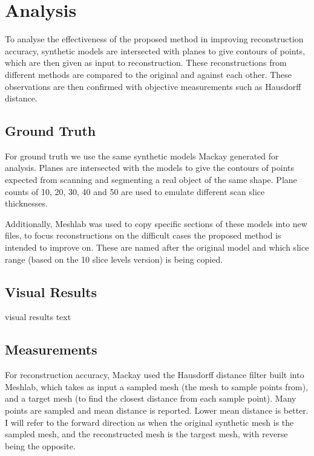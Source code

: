 \documentclass[11p, titlepage]{article}
\begin{document}
\section{Analysis}

To analyse the effectiveness of the proposed method in improving reconstruction accuracy, synthetic models are intersected with planes to give contours of points, which are then given as input to reconstruction. These reconstructions from different methods are compared to the original and against each other. These observations are then confirmed with objective measurements such as Hausdorff distance.

\subsection{Ground Truth}

For ground truth we use the same synthetic models Mackay generated for analysis. Planes are intersected with the models to give the contours of points expected from scanning and segmenting a real object of the same shape. Plane counts of 10, 20, 30, 40 and 50 are used to emulate different scan slice thicknesses.

Additionally, Meshlab was used to copy specific sections of these models into new files, to focus reconstructions on the difficult cases the proposed method is intended to improve on. These are named after the original model and which slice range (based on the 10 slice levels version) is being copied.

\subsection{Visual Results}

visual results text

\subsection{Measurements}

For reconstruction accuracy, Mackay used the Hausdorff distance filter built into Meshlab, which takes as input a sampled mesh (the mesh to sample points from), and a target mesh (to find the closest distance from each sample point). Many points are sampled and mean distance is reported. Lower mean distance is better. I will refer to the forward direction as when the original synthetic mesh is the sampled mesh, and the reconstructed mesh is the targest mesh, with reverse being the opposite. 
\end{document}
